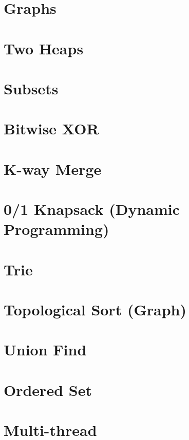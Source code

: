 



\section{Graphs}




\section{Two Heaps}


\section{Subsets}




\section{Bitwise XOR}




\section{K-way Merge}





\section{0/1 Knapsack (Dynamic Programming)}




\section{Trie}


\section{Topological Sort (Graph)}


\section{Union Find}


\section{Ordered Set}


\section{Multi-thread}


